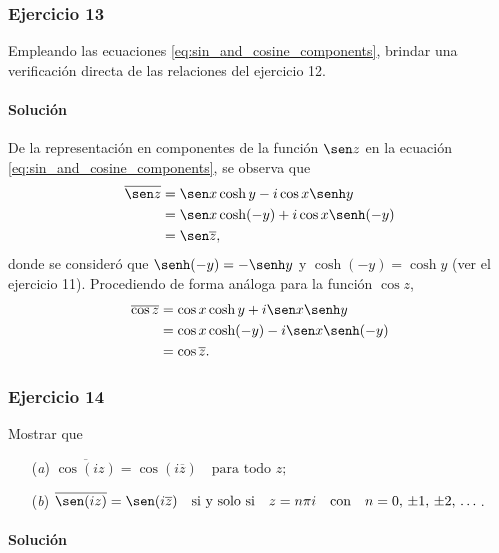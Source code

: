 \documentclass[a4paper]{report}
\begin{document}
\subsubsection{Ejercicio 13}

Empleando las ecuaciones \ref{eq:sin_and_cosine_components}, brindar una verificación directa de las relaciones del ejercicio 12.

\paragraph{Solución} De la representación en componentes de la función \(\sen z\) en la ecuación \ref{eq:sin_and_cosine_components}, se observa que 
\begin{align*}
 \overline{\sen z}&=\sen x\cosh y-i\cos x\senh y\\
   &=\sen x\cosh(-y)+i\cos x\senh(-y)\\
   &=\sen\overline{z},
\end{align*}
donde se consideró que \(\senh(-y)=-\senh y\) y \(\cosh(-y)=\cosh y\) (ver el ejercicio 11). Procediendo de forma análoga para la función \(\cos z\),
\begin{align*}
 \overline{\cos z}&=\cos x\cosh y+i\sen x\senh y\\
   &=\cos x\cosh(-y)-i\sen x\senh(-y)\\
   &=\cos\overline{z}.
\end{align*}

\subsubsection{Ejercicio 14}

Mostrar que 
\begin{enumerate}
 \item[(\textit{a})] \(\displaystyle\overline{\cos(iz)}=\cos(i\overline{z})\quad\textrm{para todo }z;\)
 \item[(\textit{b})] \(\displaystyle\overline{\sen(iz)}=\sen(i\overline{z})\quad\textrm{si y solo si}\quad z=n\pi i\quad\textrm{con}\quad n=0,\,\pm1,\,\pm2,\,\dots\).
\end{enumerate} 

\paragraph{Solución}
\end{document}
